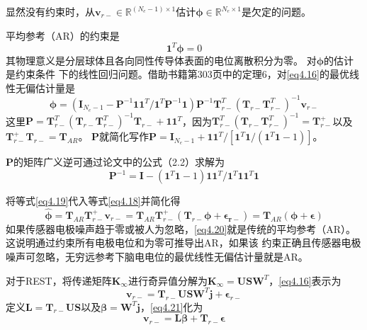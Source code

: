 显然没有约束时，从$\mathbf{v}_{r-}\in\mathbb{R}^{(N_e-1)\times1}$估计$\mathbf{\phi}\in\mathbb{R}^{N_e\times1}$是欠定的问题。

平均参考（AR）的约束是
\begin{equation}\label{eq4.17}
\mathbf{1}^T\mathbf{\phi}=0
\end{equation}
其物理意义是分层球体且各向同性传导体表面的电位离散积分为零。 对$\mathbf{\phi}$的估计是约束条件
下的线性回归问题。借助书籍第303页中的定理6，对\eqref{eq4.16}的最优线性无偏估计量是
\begin{equation}\label{eq4.18}
\hat{\mathbf{\phi}}=(\mathbf{I}_{N_e-1}-\mathbf{P}^{-1}\mathbf{11}^T/{\mathbf{1}^T\mathbf{P}^{-1}\mathbf{1}})\mathbf{P}^{-1}\mathbf{T}_{r-}^T(\mathbf{T}_{r-}\mathbf{T}_{r-}^T)^{-1}\mathbf{v}_{r-}
\end{equation}
这里$\mathbf{P}={\mathbf{T}_{r-}^T(\mathbf{T}_{r-}\mathbf{T}_{r-}^T)^{-1}\mathbf{T}_{r-}}+\mathbf{11}^T$，因为$\mathbf{T}_{r-}^T(\mathbf{T}_{r-}\mathbf{T}_{r-}^T)^{-1}=\mathbf{T}_{r-}^+$以及$\mathbf{T}_{r-}^+\mathbf{T}_{r-}=\mathbf{T}_{AR}$。 $\mathbf{P}$就简化写作$\mathbf{P}=\mathbf{I}_{N_e-1}+\mathbf{11}^T/{[\mathbf{1}^T\mathbf{1}/(\mathbf{1}^T\mathbf{1}-1)]}$。

$\mathbf{P}$的矩阵广义逆可通过论文中的公式（2.2）求解为
\begin{equation}\label{eq4.19}
\mathbf{P}^{-1}=\mathbf{I}-(\mathbf{1}^T\mathbf{1}-1)\mathbf{11}^T/{\mathbf{1}^T\mathbf{11}^T\mathbf{1}}
\end{equation}

将等式\eqref{eq4.19}代入等式\eqref{eq4.18}并简化得
\begin{equation}\label{eq4.20}
\hat{\mathbf{\phi}}=\mathbf{T}_{AR}\mathbf{T}_{r-}^+\mathbf{v}_{r-}=\mathbf{T}_{AR}\mathbf{T}_{r-}^+(\mathbf{T}_{r-}\mathbf{\phi}+\mathbf{\epsilon_{r-}})=\mathbf{T}_{AR}(\mathbf{\phi}+\mathbf{\epsilon})
\end{equation}
如果传感器电极噪声趋于零或被人为忽略，\eqref{eq4.20}就是传统的平均参考（AR）。 这说明通过约束所有电极电位和为零可推导出AR，如果该
约束正确且传感器电极噪声可忽略，无穷远参考下脑电电位的最优线性无偏估计量就是AR。

对于REST，将传递矩阵$\mathbf{K}_{\infty}$进行奇异值分解为$\mathbf{K}_{\infty}=\mathbf{USW}^T$，\eqref{eq4.16}表示为
\begin{equation}\label{eq4.21}
\mathbf{v}_{r-}=\mathbf{T}_{r-}\mathbf{USW}^T\mathbf{j}+\mathbf{\epsilon}_{r-}
\end{equation}
定义$\mathbf{L}=\mathbf{T}_{r-}\mathbf{US}$以及$\mathbf{\beta}=\mathbf{W}^T\mathbf{j}$，\eqref{eq4.21}化为
\begin{equation}\label{eq4.22}
\mathbf{v}_{r-}=\mathbf{L\beta}+\mathbf{T}_{r-}\mathbf{\epsilon}
\end{equation}

